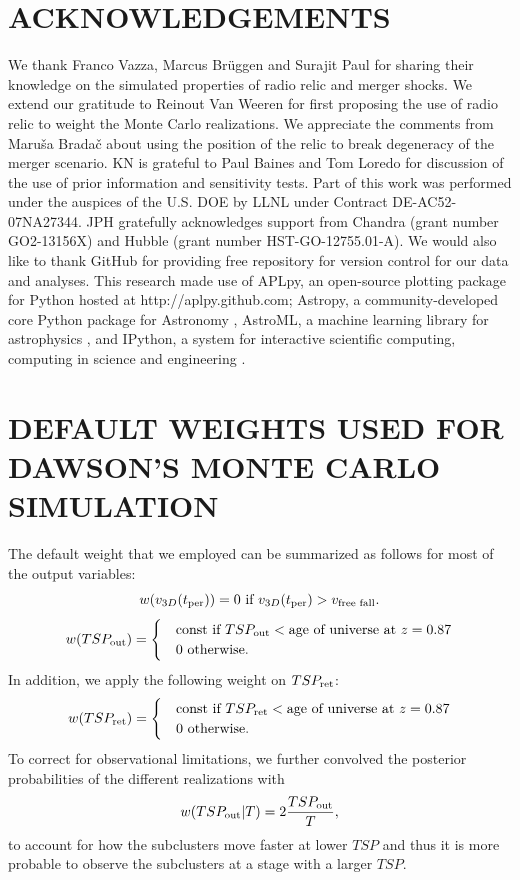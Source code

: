 \documentclass[letterpaper,useAMS,usenatbib]{mn2e}
\begin{document}
\section{ACKNOWLEDGEMENTS}
We thank Franco Vazza, Marcus Br\"{u}ggen and Surajit Paul for sharing
their knowledge on the simulated properties of radio relic and merger
shocks. We extend our gratitude to Reinout Van Weeren for first proposing the use of
radio relic to weight the Monte Carlo realizations. We appreciate the
comments from Maru\v{s}a Brada\v{c} about using the position of the relic to
break degeneracy of the merger scenario. KN is grateful to Paul Baines and
Tom Loredo for discussion of the use of prior information and sensitivity tests. 
Part of this work was performed under the auspices of the U.S. DOE by LLNL
under Contract DE-AC52-07NA27344. 
JPH gratefully acknowledges support from Chandra (grant number GO2-13156X)
and Hubble (grant number HST-GO-12755.01-A).
We would also like to thank 
GitHub for providing free repository for version control for our data and
analyses. This research made use of APLpy, an open-source plotting package for Python
hosted at http://aplpy.github.com; Astropy, a community-developed core
Python package for Astronomy \citep{astropy}, AstroML, a
machine learning library for astrophysics \citep{VanderPlas2012}, and IPython, a system for
interactive scientific computing, computing in science and engineering
\citep{Perez2007} .


\appendix
\section{DEFAULT WEIGHTS USED FOR DAWSON'S MONTE CARLO SIMULATION}
\label{app:priors}
The default weight that we employed can be summarized as
follows for most of the output variables: 
\begin{equation}
	w(v_{3D}(t_{\rm per})) = 0\text{ if }v_{3D}(t_{\rm per}) >
	v_{\text{free fall}}. 
\end{equation}
\begin{equation}
	w(TSP_{\rm out}) = 
	\begin{cases}
		& \text{const}~\text{if }TSP_{\rm out} < \text{age of universe at } z=0.87	\\
		& 0~\text{otherwise}.
	\end{cases}
\end{equation}
In addition, we apply the following weight on $TSP_{\rm ret}$:
\begin{equation}
	w(TSP_{\rm ret}) = 
	\begin{cases}
		& \text{const}~\text{if }TSP_{\rm ret} < \text{age of universe at } z=0.87	\\
		& 0~\text{otherwise} \label{eqn:TSM_1}.
	\end{cases}
\end{equation}
To correct for observational limitations, we further convolved the
posterior probabilities of the different realizations with 
\begin{equation}
	w(TSP_{\rm out} | T) = 2 \frac{TSP_{\rm out}}{T},
\end{equation}
to account for how the subclusters move faster at lower $TSP$ and thus it
is more probable to observe the subclusters at a stage with a larger $TSP$.
\par 
\end{document}
